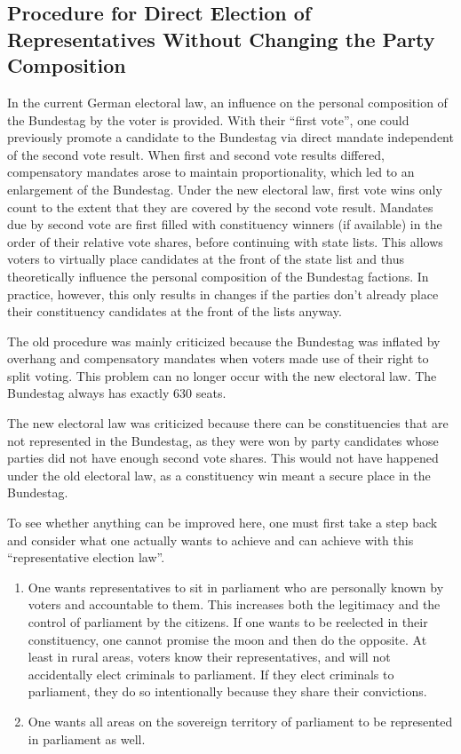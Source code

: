 \subsection{Procedure for Direct Election of Representatives Without Changing the Party Composition}

In the current German electoral law, an influence on the personal composition of the
Bundestag by the voter is provided. With their \enquote{first vote}, one could previously promote a
candidate to the Bundestag via direct mandate independent of the second vote result. When
first and second vote results differed, compensatory mandates arose to maintain
proportionality, which led to an enlargement of the Bundestag. Under the new electoral law,
first vote wins only count to the extent that they are covered by the second vote result. Mandates
due by second vote are first filled with constituency winners (if available) in the order
of their relative vote shares, before continuing with state lists. This allows
voters to virtually place candidates at the front of the state list and thus theoretically influence the personal
composition of the Bundestag factions. In practice, however, this only results in
changes if the parties don't already place their constituency candidates at the front of the lists anyway.

The old procedure was mainly criticized because the Bundestag was inflated by overhang and
compensatory mandates when voters made use of their right to split voting.
This problem can no longer occur with the new electoral law. The
Bundestag always has exactly 630 seats.

The new electoral law was criticized because there can be constituencies that are not represented in the Bundestag,
as they were won by party candidates whose parties did not have enough
second vote shares. This would not have happened under the old electoral law, as a
constituency win meant a secure place in the Bundestag.

To see whether anything can be improved here, one must first take a step
back and consider what one actually wants to achieve and can achieve with this \enquote{representative election law}.

\begin{enumerate}
  \item One wants representatives to sit in parliament who are personally known
    by voters and accountable to them. This increases both the legitimacy and the
    control of parliament by the citizens. If one wants to be
    reelected in their constituency, one cannot promise the moon and then
    do the opposite. At least in rural areas, voters know their representatives,
    and will not accidentally elect criminals to parliament. If they elect criminals to
    parliament, they do so intentionally because they share their convictions.

  \item One wants all areas on the sovereign territory of parliament to be represented
    in parliament as well.
\end{enumerate}

